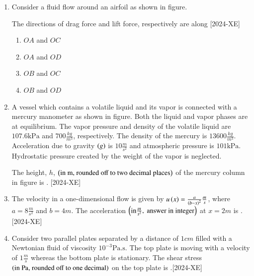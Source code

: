 \documentclass[journal]{IEEEtran}
\begin{document}
\begin{enumerate}[start=27]
\item Consider a fluid flow around an airfoil as shown in figure.
\begin{figure}[H]
    \centering
    
    \label{34}
\end{figure}
The directions of drag force and lift force, respectively are along \hfill{[2024-XE]}\\
\begin{enumerate}
    \item $OA$ and $OC$\\
    \item $OA$ and $OD$\\
    \item $OB$ and $OC$\\
    \item $OB$ and $OD$\\
\end{enumerate}

\item A vessel which contains a volatile liquid and its vapor is connected with a mercury manometer as shown in figure. Both the liquid and vapor phases are at equilibrium. The vapor pressure and density of the volatile liquid are $107.6 \text{kPa}$ and $700 \frac{kg}{m^3}$, respectively. The density of the mercury is $13600 \frac{kg}{m^3}$. Acceleration due to gravity $\left(g\right)$ is $10 \frac{m}{s^2}$ and atmospheric pressure is $101 \text{kPa}$. Hydrostatic pressure created by the weight of the vapor is neglected.

\begin{figure}[H]
    \centering
    
    \label{35}
\end{figure}

The height, $h$, $\left(\text{in m, rounded off to two decimal places}\right)$ of the mercury column in figure is \underline{\hspace{1cm}}. \hfill{[2024-XE]}\\

\item The velocity in a one-dimensional flow is given by $u \left(x\right) = \frac{a}{\left(b-x\right)^2} \frac{m}{s}$, where $a=8 \frac{m}{s^2}$ and $b=4 m$. The acceleration $\left(\text{in} \frac{m}{s^2}, \text{ answer in integer}\right)$ at $x=2 m$ is \underline{\hspace{1cm}}.\hfill{[2024-XE]}\\

\item Consider two parallel plates separated by a distance of $1 cm$ filled with a Newtonian fluid of viscosity $10^{-3} \text{Pa.s}$. The top plate is moving with a velocity of $1 \frac{m}{s}$ whereas the bottom plate is stationary. The shear stress $\left(\text{in Pa, rounded off to one decimal}\right)$ on the top plate is \underline{\hspace{1cm}}.\hfill{[2024-XE]}\\


\end{enumerate}
\end{document}
